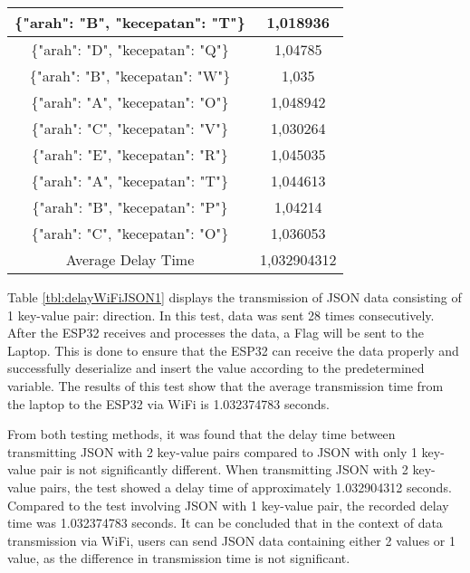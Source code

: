 \begin{table}[!ht]
\begin{tabular}{|c|c|}
  \{"arah": "B", "kecepatan": "T"\} & 1,018936    \\ \hline
  \{"arah": "D", "kecepatan": "Q"\} & 1,04785     \\ \hline
  \{"arah": "B", "kecepatan": "W"\} & 1,035       \\ \hline
  \{"arah": "A", "kecepatan": "O"\} & 1,048942    \\ \hline
  \{"arah": "C", "kecepatan": "V"\} & 1,030264    \\ \hline
  \{"arah": "E", "kecepatan": "R"\} & 1,045035    \\ \hline
  \{"arah": "A", "kecepatan": "T"\} & 1,044613    \\ \hline
  \{"arah": "B", "kecepatan": "P"\} & 1,04214     \\ \hline
  \{"arah": "C", "kecepatan": "O"\} & 1,036053    \\ \hline
  Average Delay Time                & 1,032904312 \\ \hline
  \end{tabular}
  \end{table}

Table \ref{tbl:delayWiFiJSON1} displays the transmission of JSON data consisting of 1 key-value pair: direction. In this test, data was sent 28 times consecutively. After the ESP32 receives and processes the data, a Flag will be sent to the Laptop. This is done to ensure that the ESP32 can receive the data properly and successfully deserialize and insert the value according to the predetermined variable. The results of this test show that the average transmission time from the laptop to the ESP32 via WiFi is 1.032374783 seconds.

From both testing methods, it was found that the delay time between transmitting JSON with 2 key-value pairs compared to JSON with only 1 key-value pair is not significantly different. When transmitting JSON with 2 key-value pairs, the test showed a delay time of approximately 1.032904312 seconds. Compared to the test involving JSON with 1 key-value pair, the recorded delay time was 1.032374783 seconds. It can be concluded that in the context of data transmission via WiFi, users can send JSON data containing either 2 values or 1 value, as the difference in transmission time is not significant.

